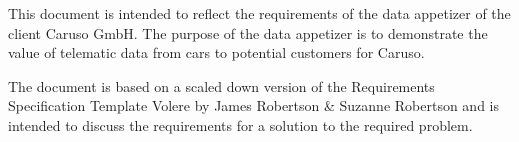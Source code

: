 This document is intended to reflect the requirements of the data appetizer of the client Caruso GmbH. The purpose of the data appetizer is to demonstrate the value of telematic data from cars to potential customers for Caruso.

The document is based on a scaled down version of the Requirements Specification Template Volere by James Robertson \& Suzanne Robertson and is intended to discuss the requirements for a solution to the required problem.